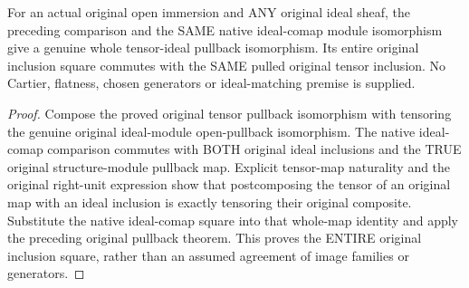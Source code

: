 \begin{theorem}
\label{sc0-scheme-tensor-ideal-pullback:original-open-ideal}
\leanok
For an actual original open immersion and ANY original ideal sheaf, the
preceding comparison and the SAME native ideal-comap module isomorphism
give a genuine whole tensor-ideal pullback isomorphism. Its entire original
inclusion square commutes with the SAME pulled original tensor inclusion.
No Cartier, flatness, chosen generators or ideal-matching premise is supplied.
\end{theorem}
\begin{proof}
Compose the proved original tensor pullback isomorphism with tensoring
the genuine original ideal-module open-pullback isomorphism. The native
ideal-comap comparison commutes with BOTH original ideal inclusions and
the TRUE original structure-module pullback map. Explicit tensor-map
naturality and the original right-unit expression show that postcomposing
the tensor of an original map with an ideal inclusion is exactly tensoring
their original composite. Substitute the native ideal-comap square into
that whole-map identity and apply the preceding original pullback theorem.
This proves the ENTIRE original inclusion square, rather than an assumed
agreement of image families or generators.
\end{proof}
